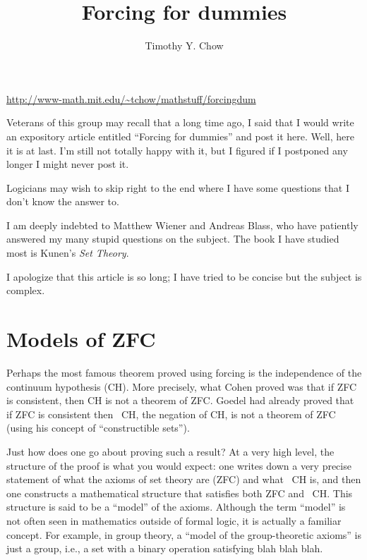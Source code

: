 \documentclass[10pt]{article}
\title{Forcing for dummies}
\author{Timothy Y. Chow} %
\date{}
\newcommand\axiom[1]{\textmd{#1}}
\theoremstyle{definition}
\theoremstyle{remark}
\begin{document}
\maketitle

\begin{center}
\url{http://www-math.mit.edu/~tchow/mathstuff/forcingdum}
\end{center}

Veterans of this group may recall that a long time ago, I said that I would write an expository article entitled ``Forcing for dummies'' and post it here. Well, here it is at last. I'm still not totally happy with it, but I figured if I postponed any longer I might never post it. 

Logicians may wish to skip right to the end where I have some questions that I don't know the answer to.

I am deeply indebted to Matthew Wiener and Andreas Blass, who have patiently answered my many stupid questions on the subject. The book I have studied most is Kunen's \textit{Set Theory}. 

I apologize that this article is so long; I have tried to be concise but the subject is complex. 


\section{Models of \axiom{ZFC}}

Perhaps the most famous theorem proved using forcing is the independence of the continuum hypothesis (\axiom{CH}). More precisely, what Cohen proved was that if \axiom{ZFC} is consistent, then \axiom{CH} is not a theorem of \axiom{ZFC}. Goedel had already proved that if \axiom{ZFC} is consistent then \axiom{~CH}, the negation of \axiom{CH}, is not a theorem of \axiom{ZFC} (using his concept of ``constructible sets'').

Just how does one go about proving such a result? At a very high level, the structure of the proof is what you would expect: one writes down a very precise statement of what the axioms of set theory are (\axiom{ZFC}) and what \axiom{~CH} is, and then one constructs a mathematical structure that satisfies both \axiom{ZFC} and \axiom{~CH}. This structure is said to be a ``model'' of the axioms. Although the term ``model'' is not often seen in mathematics outside of formal logic, it is actually a familiar concept. For example, in group theory, a ``model of the group-theoretic axioms'' is just a group, i.e., a set with a binary operation satisfying blah blah blah.
\end{document}
